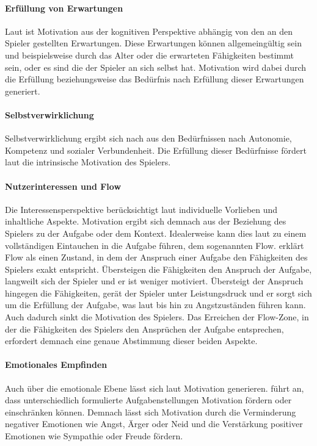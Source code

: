 \documentclass[
	oneside,  %
	ngerman, 
	final, 
	11pt, 
	a4paper, 
	1.1headlines, 
	headinclude=false, 
	footinclude=false, 
	mpinclude=false, 
	pagesize, 
	onecolumn, 
	titlepage, 
	parskip=half, 
	headsepline, 
	chapterprefix=false, 
	version=first, 
	listof=totoc, 
	bibliography=totoc, 
	toc=graduated, 
	fleqn
]{scrbook}
\begin{document}
\paragraph{Erfüllung von Erwartungen}
Laut \cite{SH2014} ist Motivation aus der kognitiven Perspektive abhängig von den an den Spieler gestellten Erwartungen.
Diese Erwartungen können allgemeingültig sein und beispielsweise durch das Alter oder die erwarteten Fähigkeiten bestimmt sein, oder es sind die der Spieler an sich selbst hat.
Motivation wird dabei durch die Erfüllung beziehungsweise das Bedürfnis nach Erfüllung dieser Erwartungen generiert.

\paragraph{Selbstverwirklichung}
Selbstverwirklichung ergibt sich nach \cite{SH2014} aus den Bedürfnissen nach Autonomie, Kompetenz und sozialer Verbundenheit.
Die Erfüllung dieser Bedürfnisse fördert laut \cite{SH2014} die intrinsische Motivation des Spielers.

\paragraph{Nutzerinteressen und Flow}
Die Interessensperspektive berücksichtigt laut \cite{SH2014} individuelle Vorlieben und inhaltliche Aspekte.
Motivation ergibt sich demnach aus der Beziehung des Spielers zu der Aufgabe oder dem Kontext.
Idealerweise kann dies laut \cite{SH2014} zu einem vollständigen Eintauchen in die Aufgabe führen, dem sogenannten \glqq Flow\grqq{}.
\cite{Zi2011} erklärt Flow als einen Zustand, in dem der Anspruch einer Aufgabe den Fähigkeiten des Spielers exakt entspricht.
Übersteigen die Fähigkeiten den Anspruch der Aufgabe, langweilt sich der Spieler und er ist weniger motiviert.
Übersteigt der Anspruch hingegen die Fähigkeiten, gerät der Spieler unter Leistungsdruck und er sorgt sich um die Erfüllung der Aufgabe, was laut \cite{As2000} bis hin zu Angstzuständen führen kann.
Auch dadurch sinkt die Motivation des Spielers.
Das Erreichen der Flow-Zone, in der die Fähigkeiten des Spielers den Ansprüchen der Aufgabe entsprechen, erfordert demnach eine genaue Abstimmung dieser beiden Aspekte.

\paragraph{Emotionales Empfinden}
Auch über die emotionale Ebene lässt sich laut \cite{SH2014} Motivation generieren.
\cite{As2000} führt an, dass unterschiedlich formulierte Aufgabenstellungen Motivation fördern oder einschränken können.
Demnach lässt sich Motivation durch die Verminderung negativer Emotionen wie Angst, Ärger oder Neid und die Verstärkung positiver Emotionen wie Sympathie oder Freude fördern.
\end{document}

